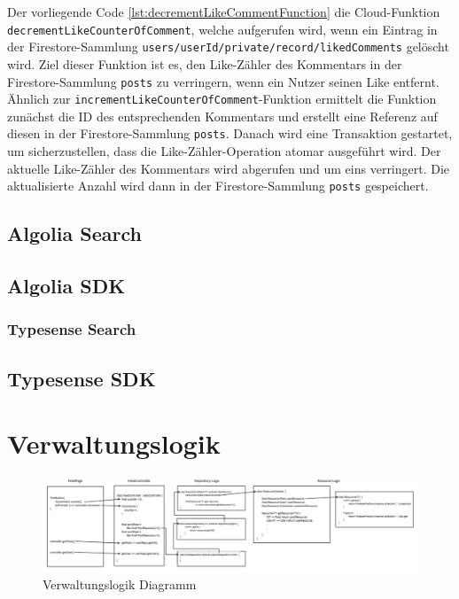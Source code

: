 Der vorliegende Code \ref{lst:decrementLikeCommentFunction} die Cloud-Funktion \texttt{decrementLikeCounterOfComment}, welche aufgerufen wird, wenn ein Eintrag in der Firestore-Sammlung \texttt{users/{userId}/private/record/likedComments} gelöscht wird. Ziel dieser Funktion ist es, den Like-Zähler des Kommentars in der Firestore-Sammlung \texttt{posts} zu verringern, wenn ein Nutzer seinen Like entfernt. Ähnlich zur \texttt{incrementLikeCounterOfComment}-Funktion ermittelt die Funktion zunächst die ID des entsprechenden Kommentars und erstellt eine Referenz auf diesen in der Firestore-Sammlung \texttt{posts}. Danach wird eine Transaktion gestartet, um sicherzustellen, dass die Like-Zähler-Operation atomar ausgeführt wird. Der aktuelle Like-Zähler des Kommentars wird abgerufen und um eins verringert. Die aktualisierte Anzahl wird dann in der Firestore-Sammlung \texttt{posts} gespeichert.

\subsection{Algolia Search}
\subsection{Algolia SDK}

\subsubsection{Typesense Search}
\subsection{Typesense SDK}

\section{Verwaltungslogik}

\begin{figure}[h]
  \centering
  \includegraphics[width=1\textwidth]{pics/Repository-Resource-Diagram.jpg}
  \caption{Verwaltungslogik Diagramm}
  \label{fig:management-logic-diagram}
\end{figure}

